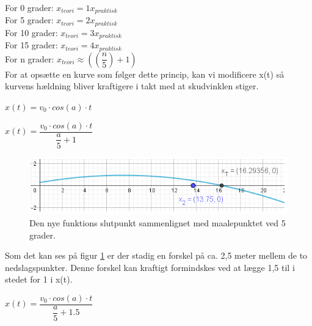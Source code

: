 For 0 grader:	$x_{teori} = 1x_{praktisk} $\\
For 5 grader:	$x_{teori} = 2x_{praktisk} $\\
For 10 grader:	$x_{teori} = 3x_{praktisk} $\\
For 15 grader:	$x_{teori} = 4x_{praktisk} $\\[0.5cm]

For n grader: $ x_{teori} \approx ((\dfrac{n}{5})+1) $\\[0.5cm]

For at opsætte en kurve som følger dette princip, kan vi modificere x(t) så kurvens hældning bliver kraftigere i takt med at skudvinklen stiger.\\

\begin{center}
\begin{math}
x(t) = v_{0} \cdot cos(a) \cdot t
\end{math}
\end{center}

\begin{center}
\begin{math}
x(t) = \dfrac{v_{0} \cdot cos(a) \cdot t}{\dfrac{a}{5} + 1}
\end{math}
\end{center}

\begin{figure}[H]
\centering
\includegraphics[scale=0.7]{Billeder/Resultatbehandling5.png}
\caption{Den nye funktions slutpunkt sammenlignet med maalepunktet ved 5 grader.}
\label{fig:Resultatbehandling5}
\end{figure}

Som det kan ses på figur \ref{fig:Resultatbehandling5} er der stadig en forskel på ca. 2,5 meter mellem de to nedslagspunkter. Denne forskel kan kraftigt formindskes ved at lægge 1,5 til i stedet for 1 i x(t).\\

\begin{center}
\begin{math}
x(t) = \dfrac{v_{0} \cdot cos(a) \cdot t}{\dfrac{a}{5} + 1.5}
\end{math}
\end{center}

